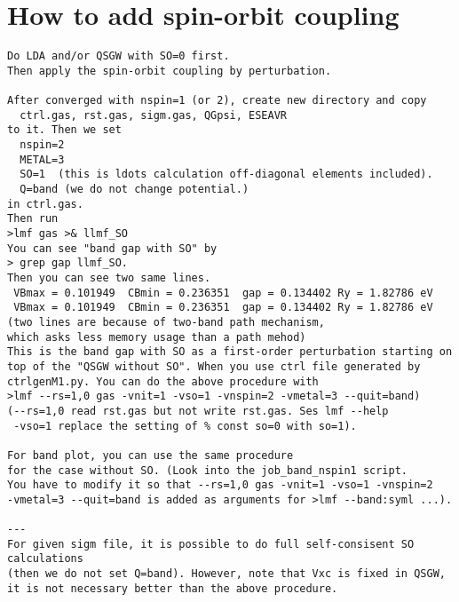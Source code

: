 \documentclass[a4paper,10pt,epsf,fleqn]{article}
\begin{document}
\appendix
\section{How to add spin-orbit coupling}
\begin{verbatim}
Do LDA and/or QSGW with SO=0 first.
Then apply the spin-orbit coupling by perturbation.

After converged with nspin=1 (or 2), create new directory and copy
  ctrl.gas, rst.gas, sigm.gas, QGpsi, ESEAVR
to it. Then we set
  nspin=2 
  METAL=3
  SO=1  (this is ldots calculation off-diagonal elements included).
  Q=band (we do not change potential.)
in ctrl.gas. 
Then run
>lmf gas >& llmf_SO
You can see "band gap with SO" by 
> grep gap llmf_SO.
Then you can see two same lines.
 VBmax = 0.101949  CBmin = 0.236351  gap = 0.134402 Ry = 1.82786 eV
 VBmax = 0.101949  CBmin = 0.236351  gap = 0.134402 Ry = 1.82786 eV
(two lines are because of two-band path mechanism, 
which asks less memory usage than a path mehod)
This is the band gap with SO as a first-order perturbation starting on
top of the "QSGW without SO". When you use ctrl file generated by
ctrlgenM1.py. You can do the above procedure with
>lmf --rs=1,0 gas -vnit=1 -vso=1 -vnspin=2 -vmetal=3 --quit=band)
(--rs=1,0 read rst.gas but not write rst.gas. Ses lmf --help
 -vso=1 replace the setting of % const so=0 with so=1).

For band plot, you can use the same procedure 
for the case without SO. (Look into the job_band_nspin1 script.
You have to modify it so that --rs=1,0 gas -vnit=1 -vso=1 -vnspin=2
-vmetal=3 --quit=band is added as arguments for >lmf --band:syml ...).

---
For given sigm file, it is possible to do full self-consisent SO calculations
(then we do not set Q=band). However, note that Vxc is fixed in QSGW, 
it is not necessary better than the above procedure.
\end{verbatim}
\end{document}
